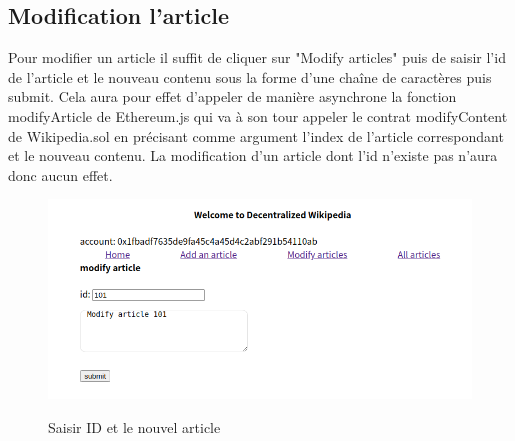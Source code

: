 \documentclass[14px]{article}
\begin{document}
	\subsection{Modification l'article}
	Pour modifier un article il suffit de cliquer sur "Modify articles" puis de saisir l'id de l'article et le nouveau contenu sous la forme d'une chaîne de caractères puis submit. Cela aura pour effet d'appeler de manière asynchrone la fonction modifyArticle de Ethereum.js qui va à son tour appeler le contrat modifyContent de Wikipedia.sol en précisant comme argument l'index de l'article correspondant et le nouveau contenu. La modification d'un article dont l'id n'existe pas n'aura donc aucun effet.
		\begin{figure}[H]
		\begin{minipage}[H]{0.7\linewidth}
			\centering
			\includegraphics[width=\textwidth]{Modify01.png}\\
			\caption{Saisir ID et le nouvel article}
			\label{img1}
		\end{minipage}
		\begin{minipage}[H]{0.3\linewidth}
			\centering

\end{minipage}
\end{figure}
\end{document}
